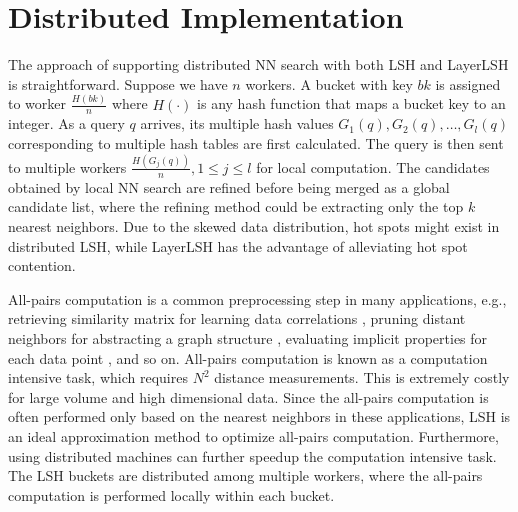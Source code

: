 \section{Distributed Implementation}
\label{sec:distributed}

 The approach of supporting distributed NN search with both LSH and LayerLSH is straightforward. Suppose we have $n$ workers. A bucket with key $bk$ is assigned to worker $\frac{H(bk)}{n}$ where $H(\cdot)$ is any hash function that maps a bucket key to an integer. As a query $q$ arrives, its multiple hash values $G_1(q), G_2(q), \ldots, G_l(q)$ corresponding to multiple hash tables are first calculated. The query is then sent to multiple workers $\frac{H(G_j(q))}{n}, 1\leq j\leq l$ for local computation. The candidates obtained by local NN search are refined before being merged as a global candidate list, where the refining method could be extracting only the top $k$ nearest neighbors. Due to the skewed data distribution, hot spots might exist in distributed LSH, while LayerLSH has the advantage of alleviating hot spot contention.

\begin{comment}
\Paragraph{LSB and LayerLSB} The basic idea of NN search in LSB is bidirectional expansion on an ordered $z$-values list. In distributed implementation, it is intuitive to split the $z$-values list by range partition and let each worker serve for a range of the list. However, hot spots might exist due to skewed data distribution. We assign the dense ranges to additional workers to distribute the heavy workload. Upon receiving a query request, the worker routes the query to additional workers, such that the heavy workload can be shared by redundant workers. Considering the high synchronization cost in distributed processing, a set of local neighbors are returned rather than only one at each time. Similarly, in distributed LayerLSB, the child trees' $z$-values are also split by range partition and allocated to additional workers. Upon receiving a query request, the worker that holds the parent tree first compute its $z$-values with child LSB base, and routes the query to the corresponding workers where the $z$-values are covered.
\end{comment}

 All-pairs computation is a common preprocessing step in many applications, e.g., retrieving similarity matrix for learning data correlations \cite{allpair1}, pruning distant neighbors for abstracting a graph structure \cite{ap}, evaluating implicit properties for each data point \cite{lshcluster}, and so on. All-pairs computation is known as a computation intensive task, which requires $N^2$ distance measurements. This is extremely costly for large volume and high dimensional data. Since the all-pairs computation is often performed only based on the nearest neighbors in these applications, LSH is an ideal approximation method to optimize all-pairs computation. Furthermore, using distributed machines can further speedup the computation intensive task. The LSH buckets are distributed among multiple workers, where the all-pairs computation is performed locally within each bucket.


